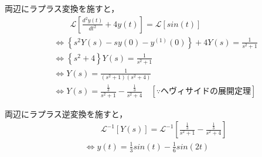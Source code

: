 \documentclass[a4paper,12pt]{article}
\begin{document}
\begin{tcolorbox}[title={[20] つぎの微分方程式をラプラス変換を用いて解け．\\
  \[
  \frac{d^2y(t)}{dt^2} + 4 y(t) = sin(t)
  \]
  
  \quad ただし，初期条件は，\(y(0)=0, y^{(1)}(0)=0\) とする． }]


    \quad 両辺にラプラス変換を施すと，
    \vspace{-3mm}
    \begin{align*}
        &\qquad \mathcal{L}\left[ \frac{d^2y(t)}{dt^2} + 4 y(t) \right] 
        = \mathcal{L} \left[ sin(t) \right] \\
        &\Leftrightarrow \left\{ s^2 Y(s) - sy(0) - y^{(1)}(0) \right\}
        + 4 Y(s) = \frac{1}{s^2 + 1}  \\
        &\Leftrightarrow \left\{ s^2 + 4 \right\} Y(s) = \frac{1}{s^2 + 1}  \\
        &\Leftrightarrow Y(s) = \frac{1}{(s^2+1)(s^2+4)}  \\
        &\Leftrightarrow Y(s) = \frac{ \frac{1}{3} }{s^2+1} - \frac{ \frac{1}{3} }{s^2+4} 
        \quad \left[\because ヘヴィサイドの展開定理 \right]
    \end{align*}
        
    \quad 両辺にラプラス逆変換を施すと，
    \vspace{-3mm}
    \begin{align*}
    &\qquad \mathcal{L}^{-1} \left[ Y(s) \right] 
    = \mathcal{L}^{-1} \left[  \frac{ \frac{1}{3} }{s^2+1} - \frac{ \frac{1}{3} }{s^2+4}   \right] \\
    &\Leftrightarrow y(t) = \frac{1}{3}sin(t) - \frac{1}{6}sin(2t)
    \end{align*}
  \end{tcolorbox}

  
\end{document}
